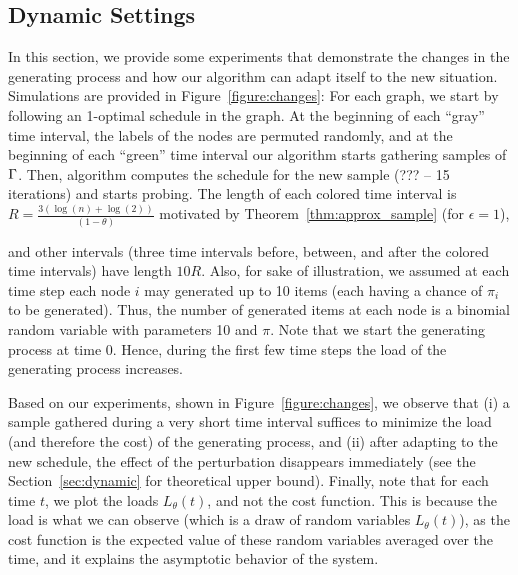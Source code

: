 \subsection{Dynamic Settings}\label{sec:dynset}
In this section, we provide some experiments that demonstrate the changes in the
generating process and how our algorithm can adapt itself to the new situation.
Simulations are provided in Figure~\ref{figure:changes}: For each graph, we
start by following an 1-optimal schedule in the graph. At the beginning of each
``gray'' time interval, the labels of the nodes are permuted randomly, and at
the beginning of each ``green'' time interval our algorithm starts gathering
samples of $\Gamma$. Then, algorithm computes the schedule for the new sample
(??? -- 15 iterations) and starts probing. The length of each colored time
interval is $R = \frac{3(\log(n)+\log(2))}{(1-\theta)}$ motivated by
Theorem~\ref{thm:approx_sample} (for $\epsilon=1$),



and other intervals (three time intervals before, between, and after the colored time intervals) have length $10R$. Also, for sake of illustration, we assumed at each time step each node $i$ may generated up to 10 items (each having a chance of $\pi_i$ to be generated). Thus, the number of generated items at each node is a binomial random variable with parameters 10 and $\pi$.
Note that we start the generating process at time 0. Hence, during the first few time steps the load of the generating process increases.

Based on our experiments, shown in Figure~\ref{figure:changes}, we observe that (i) a sample gathered during a very short time interval suffices to minimize the load (and therefore the cost) of the generating process, and (ii) after adapting to the new schedule, the effect of the perturbation disappears immediately (see the Section~\ref{sec:dynamic} for theoretical upper bound). Finally, note that for each time $t$, we plot the loads $L_\theta(t)$, and not the cost function. This is because the load is what we can observe (which is a draw of random variables $L_\theta(t)$), as the cost function is the expected value of these random variables averaged over the time, and it explains  the asymptotic behavior of the system.




